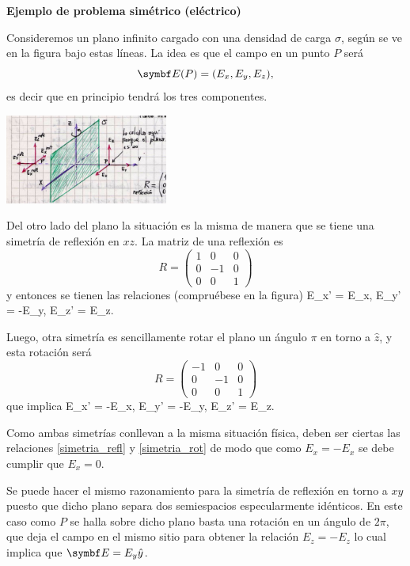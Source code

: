 \documentclass[10pt,oneside]{CBFT_book}
\begin{document}
\begin{ejemplo}{\bf Ejemplo de problema simétrico (eléctrico)}

Consideremos un plano infinito cargado con una densidad de carga $\sigma$, según se
ve en la figura bajo estas líneas. 
La idea es que el campo en un punto $P$ será 
\[
	\vb{E}(P) = (E_x, E_y, E_z), 
\]
es decir que en principio tendrá los tres componentes.

\includegraphics[width=0.4\textwidth]{images/fig_ft1_ej_plano_cargado.jpg}

Del otro lado del plano la situación es la misma de manera que se tiene una simetría de 
reflexión en $xz$. La matriz de una reflexión es 
\[
	R = \begin{pmatrix}
		1 & 0 & 0 \\
		0 & -1 & 0 \\
		0 & 0 & 1
	\end{pmatrix}
\]
y entonces se tienen las relaciones (compruébese en la figura)
\be
	E_x' = E_x, \qquad E_y' = -E_y, \qquad E_z' = E_z.
	\label{simetria_refl}
\ee

Luego, otra simetría es sencillamente rotar el plano un ángulo $\pi$ en torno a $\hat{z}$,
y esta rotación será 
\[
	R = \begin{pmatrix}
		-1 & 0 & 0 \\
		0 & -1 & 0 \\
		0 & 0 & 1
	\end{pmatrix}
\]
que implica 
\be
	E_x' = -E_x, \qquad E_y' = -E_y, \qquad E_z' = E_z.
	\label{simetria_rot}
\ee

Como ambas simetrías conllevan a la misma situación física, deben ser ciertas las relaciones 
\eqref{simetria_refl} y \eqref{simetria_rot} de modo que como $E_x = - E_x$ se debe cumplir 
que $E_x = 0$.

Se puede hacer el mismo razonamiento para la simetría de reflexión en torno a $xy$ puesto que
dicho plano separa dos semiespacios especularmente idénticos. En este caso como $P$ se halla
sobre dicho plano basta una rotación en un ángulo de $2\pi$, que deja el campo en el mismo
sitio para obtener la relación $E_z = - E_z$ lo cual implica que $\vb{E} = E_y \hat{y}$.
\end{ejemplo}
\end{document}
